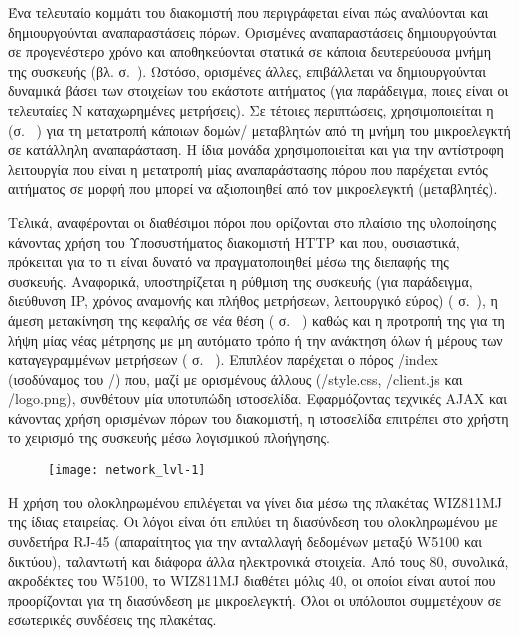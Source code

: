 Ένα τελευταίο κομμάτι του διακομιστή που περιγράφεται είναι πώς αναλύονται και
δημιουργούνται αναπαραστάσεις πόρων. Ορισμένες αναπαραστάσεις δημιουργούνται σε
προγενέστερο χρόνο και αποθηκεύονται στατικά σε κάποια δευτερεύουσα μνήμη της
συσκευής (βλ.  σ.~\pageref{subsec:network:files}).
Ωστόσο, ορισμένες άλλες, επιβάλλεται να δημιουργούνται δυναμικά βάσει των
στοιχείων του εκάστοτε αιτήματος (για παράδειγμα, ποιες είναι οι τελευταίες N
καταχωρημένες μετρήσεις). Σε τέτοιες περιπτώσεις, χρησιμοποιείται η
 (σ.~%
\pageref{subsec:network:representation}) για τη μετατροπή κάποιων δομών\slash{}%
μεταβλητών από τη μνήμη του μικροελεγκτή σε κατάλληλη αναπαράσταση. Η ίδια
μονάδα χρησιμοποιείται και για την αντίστροφη λειτουργία που είναι η μετατροπή
μίας αναπαράστασης πόρου που παρέχεται εντός αιτήματος σε μορφή που μπορεί να
αξιοποιηθεί από τον μικροελεγκτή (μεταβλητές).

Τελικά, αναφέρονται οι διαθέσιμοι πόροι που ορίζονται στο πλαίσιο της υλοποίησης
κάνοντας χρήση του Υποσυστήματος διακομιστή HTTP και που, ουσιαστικά, πρόκειται
για το τι είναι δυνατό να πραγματοποιηθεί μέσω της διεπαφής της συσκευής.
Αναφορικά, υποστηρίζεται η ρύθμιση της συσκευής (για παράδειγμα, διεύθυνση IP,
χρόνος αναμονής και πλήθος μετρήσεων, λειτουργικό εύρος)
( σ.~\pageref{subsec:network:config}), η άμεση
μετακίνηση της κεφαλής σε νέα θέση ( σ.~%
\pageref{subsec:network:coordinates}) καθώς και η προτροπή της για τη λήψη μίας
νέας μέτρησης με μη αυτόματο τρόπο ή την ανάκτηση όλων ή μέρους των
καταγεγραμμένων μετρήσεων ( σ.~%
\pageref{subsec:network:measurement}). Επιπλέον παρέχεται ο πόρος /index
(ισοδύναμος του /) που, μαζί με ορισμένους άλλους (/style.css, /client.js και
/logo.png), συνθέτουν μία υποτυπώδη ιστοσελίδα. Εφαρμόζοντας τεχνικές AJAX και
κάνοντας χρήση ορισμένων πόρων του διακομιστή, η ιστοσελίδα επιτρέπει στο χρήστη
το χειρισμό της συσκευής μέσω λογισμικού πλοήγησης.

\begin{figure}
    \caption{
    \label{fig:network:lvl-1}}
    \begin{center}
    \texttt{[image: network\_lvl-1]}
    \end{center}
\end{figure}


Η χρήση του ολοκληρωμένου επιλέγεται να γίνει δια μέσω της πλακέτας WIZ811MJ της
ίδιας εταιρείας. Οι λόγοι είναι ότι επιλύει τη διασύνδεση του ολοκληρωμένου με
συνδετήρα RJ-45 (απαραίτητος για την ανταλλαγή δεδομένων μεταξύ W5100 και
δικτύου), ταλαντωτή και διάφορα άλλα ηλεκτρονικά στοιχεία. Από τους 80,
συνολικά, ακροδέκτες του W5100, το WIZ811MJ διαθέτει μόλις 40, οι οποίοι είναι
αυτοί που προορίζονται για τη διασύνδεση με μικροελεγκτή. Όλοι οι υπόλοιποι
συμμετέχουν σε εσωτερικές συνδέσεις της πλακέτας.


